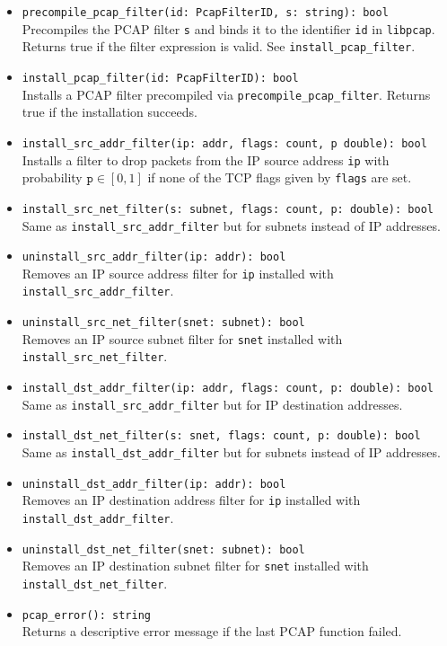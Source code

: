\documentclass[10pt,landscape]{article}
\begin{document}
\begin{multicols*}{2}
\begin{itemize}
  \item \verb|precompile_pcap_filter(id: PcapFilterID, s: string): bool|\\
    Precompiles the PCAP filter \verb|s| and binds it to the identifier
    \verb|id| in \texttt{libpcap}. Returns true if the filter expression is
    valid. See \verb|install_pcap_filter|.
  \item \verb|install_pcap_filter(id: PcapFilterID): bool|\\
    Installs a PCAP filter precompiled via \verb|precompile_pcap_filter|.
    Returns true if the installation succeeds.
  \item \verb|install_src_addr_filter(ip: addr, flags: count, p double): bool|\\
    Installs a filter to drop packets from the IP source address \verb|ip| with
    probability $\mathtt{p} \in [0,1]$ if none of the TCP flags given by
    \verb|flags| are set.
  \item \verb|install_src_net_filter(s: subnet, flags: count, p: double): bool|\\
    Same as \verb|install_src_addr_filter| but for subnets instead of IP
    addresses.
  \item \verb|uninstall_src_addr_filter(ip: addr): bool|\\
    Removes an IP source address filter for \verb|ip| installed with
    \verb|install_src_addr_filter|.
  \item \verb|uninstall_src_net_filter(snet: subnet): bool|\\
    Removes an IP source subnet filter for \verb|snet| installed with
    \verb|install_src_net_filter|.
  \item \verb|install_dst_addr_filter(ip: addr, flags: count, p: double): bool|\\
    Same as \verb|install_src_addr_filter| but for IP destination addresses.
  \item \verb|install_dst_net_filter(s: snet, flags: count, p: double): bool|\\
    Same as \verb|install_dst_addr_filter| but for subnets instead of IP
    addresses.
  \item \verb|uninstall_dst_addr_filter(ip: addr): bool|\\
    Removes an IP destination address filter for \verb|ip| installed with
    \verb|install_dst_addr_filter|.
  \item \verb|uninstall_dst_net_filter(snet: subnet): bool|\\
    Removes an IP destination subnet filter for \verb|snet| installed with
    \verb|install_dst_net_filter|.
  \item \verb|pcap_error(): string|\\
    Returns a descriptive error message if the last PCAP function failed.
\end{itemize}


\end{multicols*}
\end{document}
